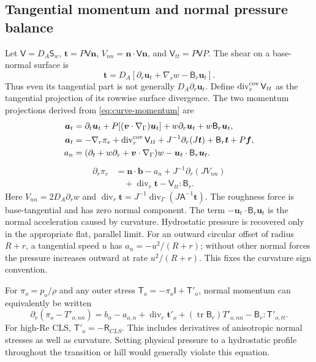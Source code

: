 \documentclass[11pt,a4paper]{article}
\numberwithin{equation}{section}
\newcommand{\tr}{\operatorname{tr}}
\newcommand{\R}{\mathsf{R}}
\newcommand{\I}{\mathsf{I}}
\newcommand{\Sm}{\mathsf{S}}
\begin{document}
\subsection{Tangential momentum and normal pressure balance}
Let $\mathsf V=D_A\Sm_w$, $\bm t=P\mathsf V\bm n$,
$V_{nn}=\bm n\cdot\mathsf V\bm n$, and
$\mathsf V_{tt}=P\mathsf V P$. The shear on a base-normal surface is
\begin{equation}
 \boxed{\bm t=D_A\left[
 \partial_r\bm u_t+\nabla_r w-\mathsf B_r\bm u_t\right].}
 \label{eq:curve-shear}
\end{equation}
Thus even its tangential part is not generally $D_A\partial_r\bm u_t$.
Define $\operatorname{div}^{\rm cov}_r\mathsf V_{tt}$ as the
tangential projection of its rowwise surface divergence. The two
momentum projections derived from \cref{eq:curve-momentum} are
\begin{align}
 \bm a_t&=\partial_t\bm u_t+
 P[(\bm v\cdot\nabla_\Gamma)\bm u_t]
 +w\partial_r\bm u_t+w\mathsf B_r\bm u_t,\nonumber\\
 \bm a_t&=-\nabla_r\pi_e
 +\operatorname{div}^{\rm cov}_r\mathsf V_{tt}
 +J^{-1}\partial_r(J\bm t)+\mathsf B_r\bm t+P\bm f,
 \label{eq:curve-tangent}\\
 a_n&=(\partial_t+w\partial_r+\bm v\cdot\nabla_\Gamma)w
       -\bm u_t\cdot \mathsf B_r\bm u_t.
 \label{eq:curve-normal-acceleration}
\end{align}
\begin{equation}
 \boxed{\begin{aligned}
 \partial_r\pi_e&=\bm n\cdot\bm b-a_n
 +J^{-1}\partial_r(JV_{nn})\\
 &\quad+\operatorname{div}_r\bm t-\mathsf V_{tt}:\mathsf B_r.
 \end{aligned}}
 \label{eq:curve-normal}
\end{equation}
Here $V_{nn}=2D_A\partial_rw$ and
$\operatorname{div}_r\bm t=J^{-1}\operatorname{div}_\Gamma
(J\mathsf A^{-1}\bm t)$. The roughness force is base-tangential and has zero
normal component. The term $-\bm u_t\cdot \mathsf B_r\bm u_t$ is the normal
acceleration caused by curvature. Hydrostatic pressure is recovered
only in the appropriate flat, parallel limit. For an outward circular
offset of radius $R+r$, a tangential speed $u$ has
$a_n=-u^2/(R+r)$; without other normal forces the pressure increases
outward at rate $u^2/(R+r)$. This fixes the curvature sign convention.

For $\pi_o=p_o/\rho$ and any outer stress
$\mathsf T_o=-\pi_o\I+\mathsf T'_o$, normal
momentum can equivalently be written
\begin{equation}
 \partial_r(\pi_o-T'_{o,nn})
 =b_n-a_{o,n}+\operatorname{div}_r\bm t'_o
  +(\tr \mathsf B_r)T'_{o,nn}-\mathsf B_r:\mathsf T'_{o,tt}.
 \label{eq:curve-normal-general}
\end{equation}
For high-Re CLS, $\mathsf T'_o=-\R_{CLS}$. This includes derivatives
of anisotropic normal stresses as well as curvature. Setting physical
pressure to a hydrostatic profile throughout the transition or hill
would generally violate this equation.
\end{document}
